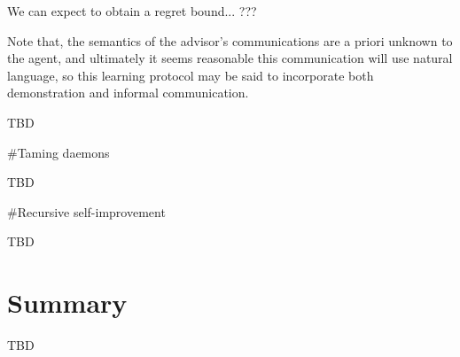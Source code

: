 \documentclass[a4paper]{article}
\begin{document}
We can expect to obtain a regret bound... ???

Note that, the semantics of the advisor's communications are a priori unknown to the agent, and ultimately it seems reasonable this communication will use natural language, so this learning protocol may be said to incorporate both demonstration and informal communication.


TBD

\#Taming daemons

TBD

\#Recursive self-improvement

TBD

\section{Summary}


TBD
\end{document}
